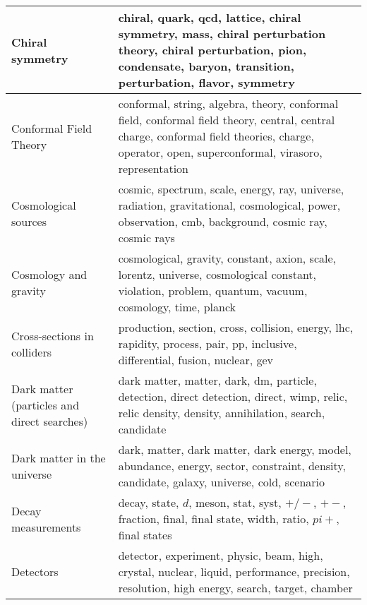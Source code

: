 \begin{longtable}[H]{p{}|p{}}
Chiral symmetry                                       &                                  chiral, quark, qcd, lattice, chiral symmetry, mass, chiral perturbation theory, chiral perturbation, pion, condensate, baryon, transition, perturbation, flavor, symmetry \\ \midrule
Conformal Field Theory                                &           conformal, string, algebra, theory, conformal field, conformal field theory, central, central charge, conformal field theories, charge, operator, open, superconformal, virasoro, representation \\ \midrule
Cosmological sources                                  &                                                       cosmic, spectrum, scale, energy, ray, universe, radiation, gravitational, cosmological, power, observation, cmb, background, cosmic ray, cosmic rays \\ \midrule
Cosmology and gravity                                 &                                                      cosmological, gravity, constant, axion, scale, lorentz, universe, cosmological constant, violation, problem, quantum, vacuum, cosmology, time, planck \\ \midrule
Cross-sections in colliders                           &                                                                             production, section, cross, collision, energy, lhc, rapidity, process, pair, pp, inclusive, differential, fusion, nuclear, gev \\ \midrule
Dark matter (particles and direct searches)           &                                                         dark matter, matter, dark, dm, particle, detection, direct detection, direct, wimp, relic, relic density, density, annihilation, search, candidate \\ \midrule
Dark matter in the universe                           &                                                                 dark, matter, dark matter, dark energy, model, abundance, energy, sector, constraint, density, candidate, galaxy, universe, cold, scenario \\ \midrule
Decay measurements                                    &                                                                                         decay, state, $d$, meson, stat, syst, $+/-$, $+-$, fraction, final, final state, width, ratio, $pi+$, final states \\ \midrule
Detectors                                             &                                                               detector, experiment, physic, beam, high, crystal, nuclear, liquid, performance, precision, resolution, high energy, search, target, chamber \\ \midrule

\end{longtable}
